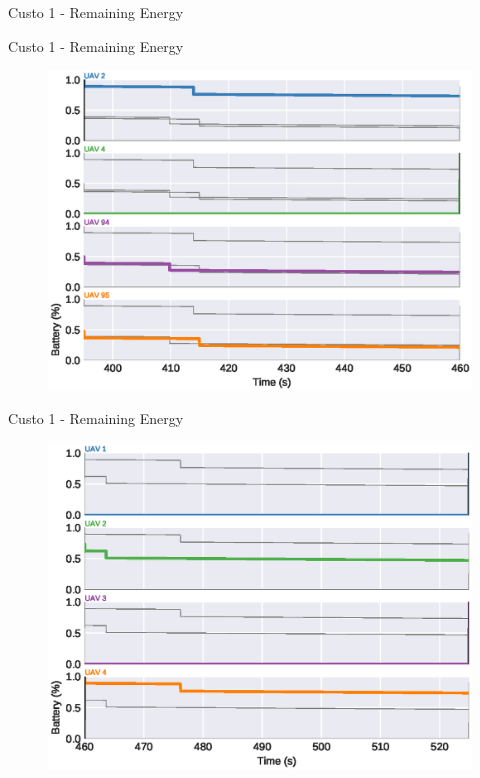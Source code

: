 \begin{frame}{Custo 1 - Remaining Energy}
\begin{figure}[!htb]
                    \end{figure}
                \end{frame}\begin{frame}{Custo 1 - Remaining Energy}
                    \begin{figure}[!htb]
                        \includegraphics[width=\textwidth]{custo_1/uav_remaining_energy_460.eps}
                    \end{figure}
                \end{frame}\begin{frame}{Custo 1 - Remaining Energy}
                    \begin{figure}[!htb]
                        \includegraphics[width=\textwidth]{custo_1/uav_remaining_energy_525.eps}

\end{figure}
\end{frame}
